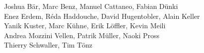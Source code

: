 %
%
%
Joshua Bär,			%
Marc Benz,			%
Manuel Cattaneo,		%
Fabian Dünki%
\\
Enez Erdem,			%
Réda Haddouche,			%
David Hugentobler,		%
Alain Keller%
\\
Yanik Kuster,			%
Marc Kühne,			%
Erik Löffler,			%
Kevin Meili%
\\
Andrea Mozzini Vellen,		%
Patrik Müller,			%
Naoki Pross%
\\
Thierry Schwaller,		%
Tim Tönz			%

